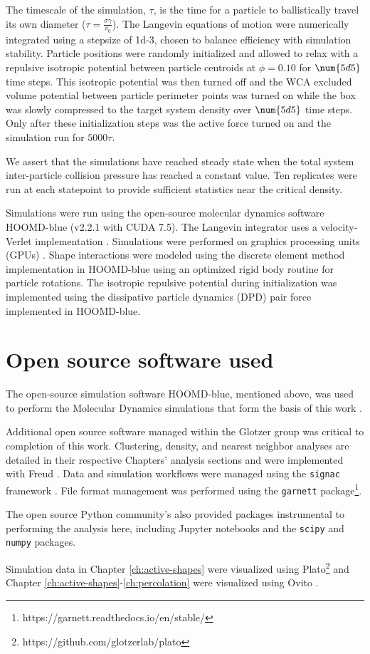 The timescale of the simulation, $\tau$, is the time for a particle to ballistically travel its own diameter ($\tau = \frac{\sigma\gamma}{v_0}$).
The Langevin equations of motion were numerically integrated using a stepsize of \num{1d-3}, chosen to balance efficiency with simulation stability.
Particle positions were randomly initialized and allowed to relax with a repulsive isotropic potential between particle centroids at $\phi=0.10$ for $\num{5d5}$ time steps.
This isotropic potential was then turned off and the WCA excluded volume potential between particle perimeter points was turned on while the box was slowly compressed to the target system density over $\num{5d5}$ time steps.
Only after these initialization steps was the active force turned on and the simulation run for $5000\tau$.

We assert that the simulations have reached steady state when the total system inter-particle collision pressure has reached a constant value.
Ten replicates were run at each statepoint to provide sufficient statistics near the critical density.

Simulations were run using the open-source molecular dynamics software HOOMD-blue (v2.2.1 with CUDA 7.5).
The Langevin integrator uses a velocity-Verlet implementation \cite{HOOMD_2008}.
Simulations were performed on graphics processing units (GPUs) \cite{HOOMD_2008, HOOMD_2015}.
Shape interactions were modeled using the discrete element method implementation in HOOMD-blue\cite{DEM_2017} using an optimized rigid body routine for particle rotations\cite{HOOMD_2015}.
The isotropic repulsive potential during initialization was implemented using the dissipative particle dynamics (DPD) pair force implemented in HOOMD-blue\cite{DPD_2011}.


\section{Open source software used}
The open-source simulation software HOOMD-blue, mentioned above, was used to perform the Molecular Dynamics simulations that form the basis of this work \cite{HOOMD_2008, HOOMD_2015}.

Additional open source software managed within the Glotzer group was critical to completion of this work. Clustering, density, and nearest neighbor analyses are detailed in their respective Chapters' analysis sections and were implemented with Freud \cite{freud}. Data and simulation workflows were managed using the \verb|signac| framework \cite{signac}. File format management was performed using the \verb|garnett| package\footnote{https://garnett.readthedocs.io/en/stable/}.

The open source Python community's also provided packages instrumental to performing the analysis here, including Jupyter notebooks\cite{jupyter} and the \verb|scipy|\cite{scipy} and \verb|numpy|\cite{numpy} packages.

Simulation data in Chapter \ref{ch:active-shapes} were visualized using Plato\footnote{https://github.com/glotzerlab/plato} and Chapter \ref{ch:active-shapes}-\ref{ch:percolation} were visualized using Ovito \cite{ovito}.

